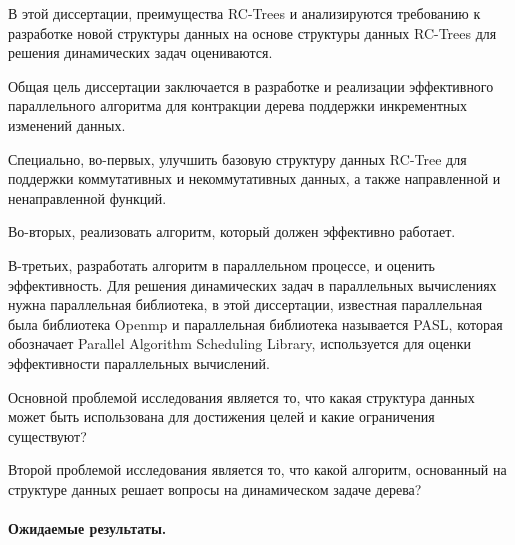 \documentclass[specification,annotation,times]{itmo-student-thesis}
\newcommand{\revise}[1]{{\color{red!70!black} #1 }}
\begin{document}
\revise{
В этой диссертации, преимущества RC-Trees и анализируются требованию к разработке новой структуры данных на 
основе структуры данных RC-Trees для решения динамических задач оцениваются.

Общая цель диссертации заключается в разработке и реализации эффективного параллельного алгоритма для 
контракции дерева поддержки инкрементных изменений данных. 

Специально, во-первых, улучшить базовую структуру данных RC-Tree для поддержки коммутативных и некоммутативных 
данных, а также направленной и ненаправленной функций. 

Во-вторых, реализовать алгоритм, который должен эффективно работает. 

В-третьих, разработать алгоритм в параллельном процессе, и оценить эффективность. Для решения динамических 
задач в параллельных вычислениях нужна параллельная библиотека, в этой диссертации, известная параллельная 
была библиотека Openmp и параллельная библиотека называется PASL, которая обозначает Parallel Algorithm 
Scheduling Library, используется для оценки эффективности параллельных вычислений. 

Основной проблемой исследования является то, что какая структура данных может быть использована для достижения 
целей и какие ограничения существуют?

Второй проблемой исследования является то, что какой алгоритм, основанный на структуре данных решает вопросы 
на динамическом задаче дерева?
}

\paragraph{Ожидаемые результаты.}
\end{document}
